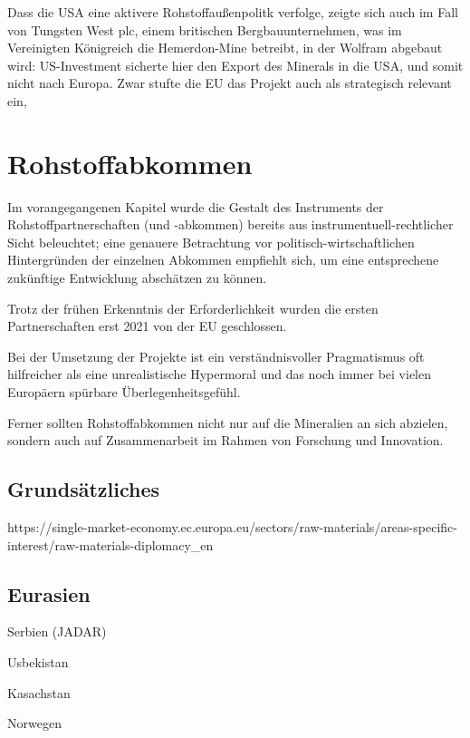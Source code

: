 \documentclass[12pt,a4paper,oneside]{book} %
\begin{document}
Dass die USA eine aktivere Rohstoffaußenpolitk verfolge, zeigte sich auch im Fall von Tungsten West plc, einem britischen Bergbauunternehmen, was im Vereinigten Königreich die Hemerdon-Mine betreibt, in der Wolfram abgebaut wird: US-Investment sicherte hier den Export des Minerals in die USA, und somit nicht nach Europa. Zwar stufte die EU das Projekt auch als strategisch relevant ein,



\section{Rohstoffabkommen}
Im vorangegangenen Kapitel wurde die Gestalt des Instruments der Rohstoffpartnerschaften (und -abkommen) bereits aus instrumentuell-rechtlicher Sicht beleuchtet; eine genauere Betrachtung vor politisch-wirtschaftlichen Hintergründen der einzelnen Abkommen empfiehlt sich, um eine entsprechene zukünftige Entwicklung abschätzen zu können.

Trotz der frühen Erkenntnis der Erforderlichkeit wurden die ersten Partnerschaften erst 2021 von der EU geschlossen.

\glqq Bei der Umsetzung der Projekte ist ein verständnisvoller Pragmatismus oft hilfreicher als eine unrealistische Hypermoral und das noch immer bei vielen Europäern spürbare Überlegenheitsgefühl.\grqq \autocite{https://www.africa-business-guide.de/de/praxis/erfahrungen/schluesselrolle-afrikas-bedeutung-bei-den-kritischen-rohstoffen--1920084}

Ferner sollten Rohstoffabkommen nicht nur auf die Mineralien an sich abzielen, sondern auch auf Zusammenarbeit im Rahmen von Forschung und Innovation.\autocite{ÖAW}

\subsection{Grundsätzliches}

https://single-market-economy.ec.europa.eu/sectors/raw-materials/areas-specific-interest/raw-materials-diplomacy_en

\subsection{Eurasien}

Serbien (JADAR)

Usbekistan

Kasachstan

Norwegen
\end{document}
